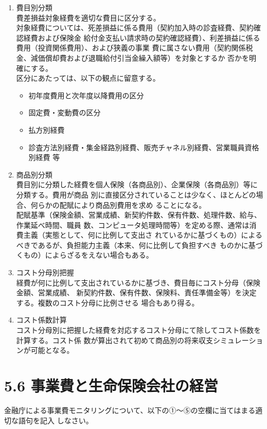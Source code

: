 \documentclass[report,gutter=10mm,fore-edge=10mm,uplatex,dvipdfmx]{jlreq}
\begin{document}
\begin{enumerate}[i]
\item[] 費目別分類\\
 費差損益対象経費を適切な費目に区分する。\\
 対象経費については、死差損益に係る費用（契約加入時の診査経費、契約確認経費および保険金
 給付金支払い請求時の契約確認経費）、利差損益に係る費用（投資関係費用）、および狭義の事業
 費に属さない費用（契約関係税金、減価償却費および退職給付引当金繰入額等）を対象とするか
 否かを明確にする。\\
 区分にあたっては、以下の観点に留意する。
\begin{itemize}
\item[] 初年度費用と次年度以降費用の区分
\item[] 固定費・変動費の区分
\item[] 払方別経費
\item[] 診査方法別経費・集金経路別経費、販売チャネル別経費、営業職員資格別経費 等
\end{itemize} 
\item[] 商品別分類\\
 費目別に分類した経費を個人保険（各商品別）、企業保険（各商品別）等に分類する。費用が商品
 別に直接区分されていることは少なく、ほとんどの場合、何らかの配賦により商品別費用を求め
 ることになる。\\
 配賦基準（保険金額、営業成績、新契約件数、保有件数、処理件数、給与、作業延べ時間、職員
 数、コンピュータ処理時間等）を定める際、通常は消費主義（実態として、何に比例して支出さ
 れているかに基づくもの）によるべきであるが、負担能力主義（本来、何に比例して負担すべき
 ものかに基づくもの）によらざるをえない場合もある。
\item[] コスト分母別把握\\
 経費が何に比例して支出されているかに基づき、費目毎にコスト分母（保険金額、営業成績、
 新契約件数、保有件数、保険料、責任準備金等）を決定する。複数のコスト分母に比例させる
 場合もあり得る。
\item[] コスト係数計算\\
 コスト分母別に把握した経費を対応するコスト分母にて除してコスト係数を計算する。コスト係
 数が算出されて初めて商品別の将来収支シミュレーションが可能となる。
\end{enumerate}

\section{5.6 事業費と生命保険会社の経営}
金融庁による事業費モニタリングについて、以下の①～⑤の空欄に当てはまる適切な語句を記入
しなさい。
\end{document}

